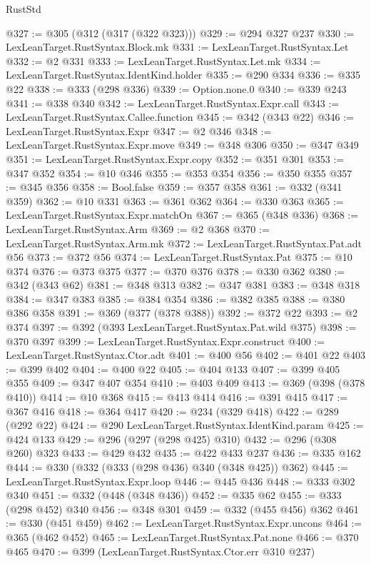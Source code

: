 \begin{lexlean}{RustStd}
\begin{coremodule}
@327 := @305 (@312 (@317 (@322 @323)))
@329 := @294 @327 @237
@330 := LexLeanTarget.RustSyntax.Block.mk
@331 := LexLeanTarget.RustSyntax.Let
@332 := @2 @331
@333 := LexLeanTarget.RustSyntax.Let.mk
@334 := LexLeanTarget.RustSyntax.IdentKind.holder
@335 := @290 @334
@336 := @335 @22
@338 := @333 (@298 @336)
@339 := Option.none.{0}
@340 := @339 @243
@341 := @338 @340
@342 := LexLeanTarget.RustSyntax.Expr.call
@343 := LexLeanTarget.RustSyntax.Callee.function
@345 := @342 (@343 @22)
@346 := LexLeanTarget.RustSyntax.Expr
@347 := @2 @346
@348 := LexLeanTarget.RustSyntax.Expr.move
@349 := @348 @306
@350 := @347 @349
@351 := LexLeanTarget.RustSyntax.Expr.copy
@352 := @351 @301
@353 := @347 @352
@354 := @10 @346
@355 := @353 @354
@356 := @350 @355
@357 := @345 @356
@358 := Bool.false
@359 := @357 @358
@361 := @332 (@341 @359)
@362 := @10 @331
@363 := @361 @362
@364 := @330 @363
@365 := LexLeanTarget.RustSyntax.Expr.matchOn
@367 := @365 (@348 @336)
@368 := LexLeanTarget.RustSyntax.Arm
@369 := @2 @368
@370 := LexLeanTarget.RustSyntax.Arm.mk
@372 := LexLeanTarget.RustSyntax.Pat.adt @56
@373 := @372 @56
@374 := LexLeanTarget.RustSyntax.Pat
@375 := @10 @374
@376 := @373 @375
@377 := @370 @376
@378 := @330 @362
@380 := @342 (@343 @62)
@381 := @348 @313
@382 := @347 @381
@383 := @348 @318
@384 := @347 @383
@385 := @384 @354
@386 := @382 @385
@388 := @380 @386 @358
@391 := @369 (@377 (@378 @388))
@392 := @372 @22
@393 := @2 @374
@397 := @392 (@393 LexLeanTarget.RustSyntax.Pat.wild @375)
@398 := @370 @397
@399 := LexLeanTarget.RustSyntax.Expr.construct
@400 := LexLeanTarget.RustSyntax.Ctor.adt
@401 := @400 @56
@402 := @401 @22
@403 := @399 @402
@404 := @400 @22
@405 := @404 @133
@407 := @399 @405 @355
@409 := @347 @407 @354
@410 := @403 @409
@413 := @369 (@398 (@378 @410))
@414 := @10 @368
@415 := @413 @414
@416 := @391 @415
@417 := @367 @416
@418 := @364 @417
@420 := @234 (@329 @418)
@422 := @289 (@292 @22)
@424 := @290 LexLeanTarget.RustSyntax.IdentKind.param
@425 := @424 @133
@429 := @296 (@297 (@298 @425) @310)
@432 := @296 (@308 @260) @323
@433 := @429 @432
@435 := @422 @433 @237
@436 := @335 @162
@444 := @330 (@332 (@333 (@298 @436) @340 (@348 @425)) @362)
@445 := LexLeanTarget.RustSyntax.Expr.loop
@446 := @445 @436
@448 := @333 @302 @340
@451 := @332 (@448 (@348 @436))
@452 := @335 @62
@455 := @333 (@298 @452) @340
@456 := @348 @301
@459 := @332 (@455 @456) @362
@461 := @330 (@451 @459)
@462 := LexLeanTarget.RustSyntax.Expr.uncons
@464 := @365 (@462 @452)
@465 := LexLeanTarget.RustSyntax.Pat.none
@466 := @370 @465
@470 := @399 (LexLeanTarget.RustSyntax.Ctor.err @310 @237)

\end{coremodule}
\end{lexlean}
